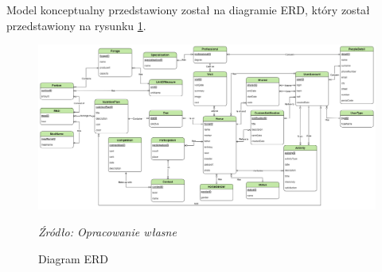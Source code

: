 \documentclass[12pt,oneside]{report}
\begin{document}
Model konceptualny przedstawiony został na diagramie ERD, który został przedstawiony na rysunku \ref{DiagramERD}.
\begin{figure}[H]
	\centering
		\includegraphics[scale=0.35, angle=-90]{DiagramERD}
		\caption{Diagram ERD}
		\textit{Źródło: Opracowanie własne}
		\label{DiagramERD}
\end{figure}
\end{document}
